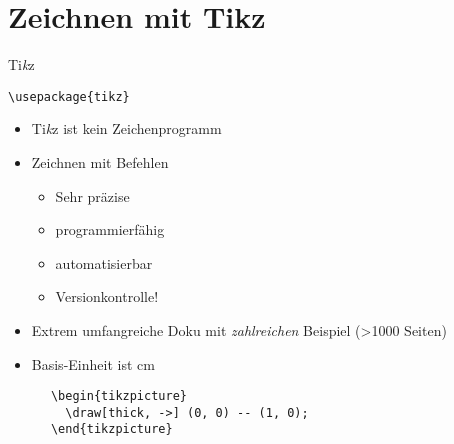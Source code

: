 \section{Zeichnen mit Tikz}

\begin{frame}[fragile]{Ti\textit{k}z}
  \begin{Packages}
    \lstinline+\usepackage{tikz}+
  \end{Packages}
  \begin{itemize}
    \item \alert{T}i\textit{k}z \alert{i}st \alert{k}ein \alert{Z}eichenprogramm
    \item Zeichnen mit Befehlen
      \begin{itemize}
        \item Sehr präzise
        \item programmierfähig
        \item automatisierbar
        \item Versionkontrolle!
      \end{itemize}
    \item Extrem umfangreiche Doku mit \emph{zahlreichen} Beispiel (>\num{1000} Seiten)
    \item Basis-Einheit ist \si{\centi\meter}
  \end{itemize}
  \begin{CodeExample}{0.7}
    \begin{lstlisting}
      \begin{tikzpicture}
        \draw[thick, ->] (0, 0) -- (1, 0);
      \end{tikzpicture}
    \end{lstlisting}
  \CodeResult
  \strut\\
  \end{CodeExample}
\end{frame}
